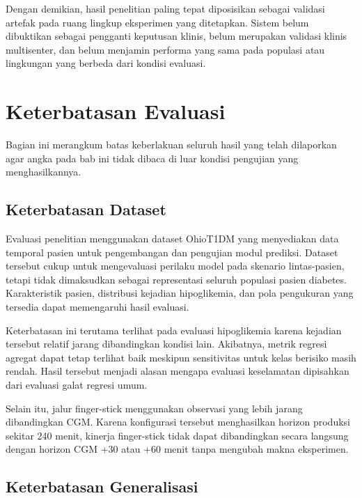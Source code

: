 Dengan demikian, hasil penelitian paling tepat diposisikan sebagai validasi artefak pada ruang lingkup eksperimen yang ditetapkan. Sistem belum dibuktikan
sebagai pengganti keputusan klinis, belum merupakan validasi klinis multisenter, dan belum menjamin performa yang sama pada populasi atau lingkungan yang
berbeda dari kondisi evaluasi.

\section{Keterbatasan Evaluasi}
\label{sec:bab6-keterbatasan-evaluasi}

Bagian ini merangkum batas keberlakuan seluruh hasil yang telah dilaporkan agar angka pada bab ini tidak dibaca di luar kondisi pengujian yang menghasilkannya.

\subsection{Keterbatasan Dataset}
\label{subsec:bab6-keterbatasan-dataset}

Evaluasi penelitian menggunakan dataset OhioT1DM yang menyediakan data temporal pasien untuk pengembangan dan pengujian modul prediksi. Dataset tersebut
cukup untuk mengevaluasi perilaku model pada skenario lintas-pasien, tetapi tidak dimaksudkan sebagai representasi seluruh populasi pasien diabetes.
Karakteristik pasien, distribusi kejadian hipoglikemia, dan pola pengukuran yang tersedia dapat memengaruhi hasil evaluasi.

Keterbatasan ini terutama terlihat pada evaluasi hipoglikemia karena kejadian tersebut relatif jarang dibandingkan kondisi lain. Akibatnya, metrik regresi
agregat dapat tetap terlihat baik meskipun sensitivitas untuk kelas berisiko masih rendah. Hasil tersebut menjadi alasan mengapa evaluasi keselamatan
dipisahkan dari evaluasi galat regresi umum.

Selain itu, jalur finger-stick menggunakan observasi yang lebih jarang dibandingkan CGM. Karena konfigurasi tersebut menghasilkan horizon produksi sekitar
240 menit, kinerja finger-stick tidak dapat dibandingkan secara langsung dengan horizon CGM +30 atau +60 menit tanpa mengubah makna eksperimen.

\subsection{Keterbatasan Generalisasi}
\label{subsec:bab6-keterbatasan-generalisasi}

